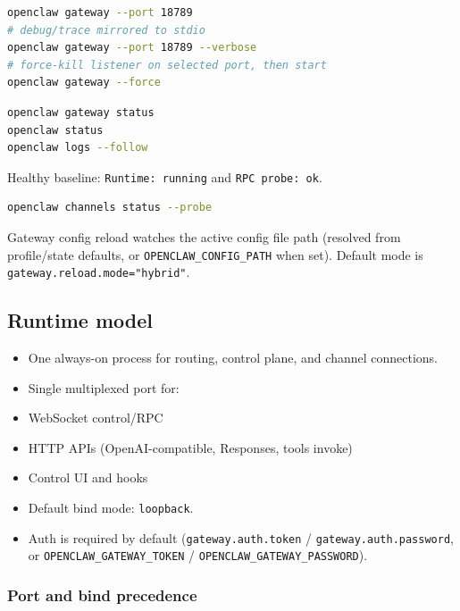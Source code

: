 \begin{lstlisting}[language=bash]
openclaw gateway --port 18789
# debug/trace mirrored to stdio
openclaw gateway --port 18789 --verbose
# force-kill listener on selected port, then start
openclaw gateway --force
\end{lstlisting}




\begin{lstlisting}[language=bash]
openclaw gateway status
openclaw status
openclaw logs --follow
\end{lstlisting}


Healthy baseline: \texttt{Runtime: running} and \texttt{RPC probe: ok}.



\begin{lstlisting}[language=bash]
openclaw channels status --probe
\end{lstlisting}



Gateway config reload watches the active config file path (resolved from profile/state defaults, or \texttt{OPENCLAW\_CONFIG\_PATH} when set).
Default mode is \texttt{gateway.reload.mode="hybrid"}.

\subsection{Runtime model}


\begin{itemize}
  \item One always-on process for routing, control plane, and channel connections.
  \item Single multiplexed port for:
  \item WebSocket control/RPC
  \item HTTP APIs (OpenAI-compatible, Responses, tools invoke)
  \item Control UI and hooks
  \item Default bind mode: \texttt{loopback}.
  \item Auth is required by default (\texttt{gateway.auth.token} / \texttt{gateway.auth.password}, or \texttt{OPENCLAW\_GATEWAY\_TOKEN} / \texttt{OPENCLAW\_GATEWAY\_PASSWORD}).
\end{itemize}


\subsubsection{Port and bind precedence}



